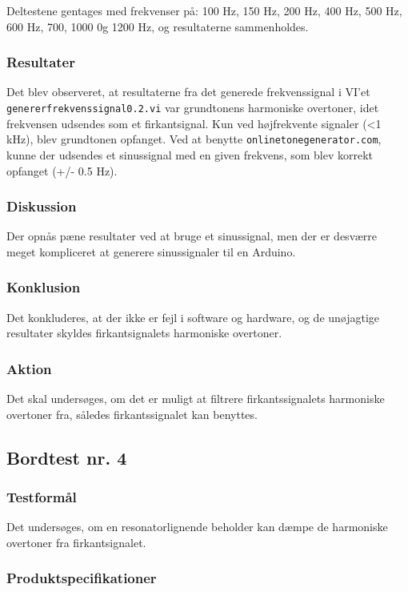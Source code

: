 			Deltestene gentages med frekvenser på: 100 Hz, 150 Hz, 200 Hz, 400 Hz, 500 Hz, 600 Hz, 700, 1000 0g 1200 Hz, og resultaterne sammenholdes. 
			
			\subsubsection{Resultater}
			 Det blev observeret, at resultaterne fra det generede frekvenssignal i VI'et \texttt{genererfrekvenssignal0.2.vi} var grundtonens harmoniske overtoner, idet frekvensen udsendes som et firkantsignal. Kun ved højfrekvente signaler (<1 kHz), blev grundtonen opfanget. 
			 Ved at benytte \texttt{onlinetonegenerator.com}, kunne der udsendes et sinussignal med en given frekvens, som blev korrekt opfanget (+/- 0.5 Hz).     
			\subsubsection{Diskussion}
			Der opnås pæne resultater ved at bruge et sinussignal, men der er desværre meget kompliceret at generere sinussignaler til en Arduino.   
			\subsubsection{Konklusion}
			Det konkluderes, at der ikke er fejl i software og hardware, og de unøjagtige resultater skyldes firkantsignalets harmoniske overtoner.  
			\subsubsection{Aktion}
			Det skal undersøges, om det er muligt at filtrere firkantssignalets harmoniske overtoner fra, således firkantssignalet kan benyttes. 
		
		\subsection{Bordtest nr. 4} %
		\subsubsection{Testformål}
		Det undersøges, om en resonatorlignende beholder kan dæmpe de harmoniske overtoner fra firkantsignalet. 
		
		\subsubsection{Produktspecifikationer}
		
